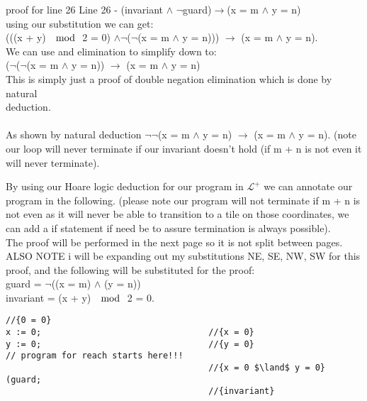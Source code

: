 \documentclass{article}
\begin{document}
\begin{enumerate}[(a)]
     \begin{list}
        \item {proof for line 26}
        Line 26 - (invariant $\land$ $\neg$guard)$\to$(x = m $\land$ y = n)\\
        using our substitution we can get:\\
        (((x + y) $\mod$ 2 = 0) $\land \neg$($\neg$(x = m $\land$ y = n))) $\to$ (x = m $\land$ y = n).\\ We can use and elimination to simplify down to:\\
        ($\neg$($\neg$(x = m $\land$ y = n)) $\to$ (x = m $\land$ y = n)\\
        This is simply just a proof of double negation elimination which is done by natural \\deduction.\\
        \\
        As shown by natural deduction $\neg\neg$(x = m $\land$ y = n) $\to$ (x = m $\land$ y = n).
        (note our loop will never terminate if our invariant doesn't hold (if m + n is not even it will never terminate).
    \end{list}
By using our Hoare logic deduction for our program in $\mathcal{L}^{+}$ we can annotate our program in the following. (please note our program will not terminate if m + n is not even as it will never be able to transition to a tile on those coordinates, we can add a if statement if need be to assure termination is always possible).\\
The proof will be performed in the next page so it is not split between pages.
\newpage
ALSO NOTE i will be expanding out my substitutions NE, SE, NW, SW for this proof, and the following will be substituted for the proof:\\
    guard = $\neg$((x = m) $\land$ (y = n))\\
    invariant = (x + y) $\mod$ 2 = 0.\\
    \begin{lstlisting}[language=Maple,mathescape=true]
                                        //{0 = 0}
x := 0;                                 //{x = 0}
y := 0;                                 //{y = 0}
// program for reach starts here!!!
                                        //{x = 0 $\land$ y = 0}
(guard;
                                        //{invariant}

\end{lstlisting}
\end{enumerate}
\end{document}

